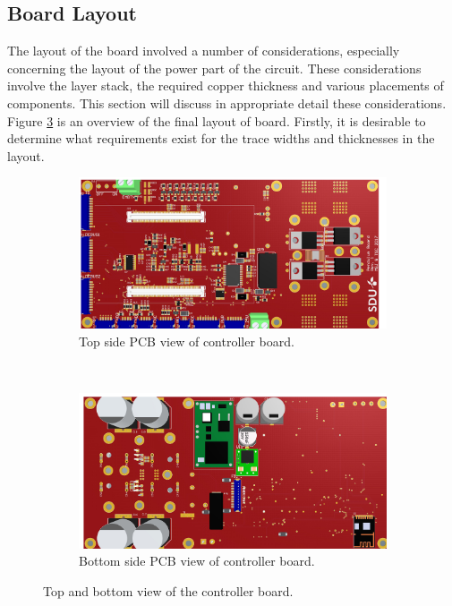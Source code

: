\subsection{Board Layout} %
\label{sub:board_layout}
The layout of the board involved a number of considerations, especially concerning the layout of the power part of the circuit.
These considerations involve the layer stack, the required copper thickness and various placements of components.
This section will discuss in appropriate detail these considerations.
Figure \ref{fig:board_layout} is an overview of the final layout of board.
Firstly, it is desirable to determine what requirements exist for the trace widths and thicknesses in the layout.

\begin{figure}
	\begin{subfigure}[b]{\textwidth}
	\centering
	\includegraphics[width=\textwidth]{graphics/top_side_pcb}
	\caption{Top side PCB view of controller board.}
	\label{fig:top_side_pcb_view}
	\end{subfigure}\\

	\begin{subfigure}[b]{\textwidth}
	\centering
	\includegraphics[width=\textwidth,angle=180]{graphics/bottom_side_pcb}
	\caption{Bottom side PCB view of controller board.}
	\label{fig:botton_side_pcb_view}
	\end{subfigure}
	\caption{Top and bottom view of the controller board.}
	\label{fig:board_layout}
\end{figure}

